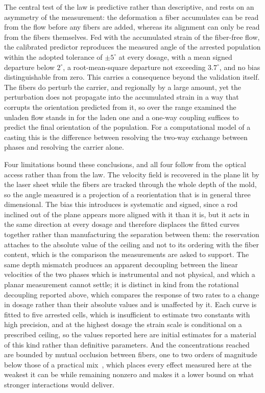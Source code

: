 \documentclass[%
  aip,
  pof,          %
  reprint,      %
  floatfix
]{revtex4-2}
\begin{document}
The central test of the law is predictive rather than descriptive, and rests on an asymmetry of the measurement: the deformation a fiber accumulates can be read from the flow before any fibers are added, whereas its alignment can only be read from the fibers themselves. Fed with the accumulated strain of the fiber-free flow, the calibrated predictor reproduces the measured angle of the arrested population within the adopted tolerance of $\pm 5^\circ$ at every dosage, with a mean signed departure below $2^\circ$, a root-mean-square departure not exceeding $3.7^\circ$, and no bias distinguishable from zero. This carries a consequence beyond the validation itself. The fibers do perturb the carrier, and regionally by a large amount, yet the perturbation does not propagate into the accumulated strain in a way that corrupts the orientation predicted from it, so over the range examined the unladen flow stands in for the laden one and a one-way coupling suffices to predict the final orientation of the population. For a computational model of a casting this is the difference between resolving the two-way exchange between phases and resolving the carrier alone.

Four limitations bound these conclusions, and all four follow from the optical access rather than from the law. The velocity field is recovered in the plane lit by the laser sheet while the fibers are tracked through the whole depth of the mold, so the angle measured is a projection of a reorientation that is in general three dimensional. The bias this introduces is systematic and signed, since a rod inclined out of the plane appears more aligned with it than it is, but it acts in the same direction at every dosage and therefore displaces the fitted curves together rather than manufacturing the separation between them: the reservation attaches to the absolute value of the ceiling and not to its ordering with the fiber content, which is the comparison the measurements are asked to support. The same depth mismatch produces an apparent decoupling between the linear velocities of the two phases which is instrumental and not physical, and which a planar measurement cannot settle; it is distinct in kind from the rotational decoupling reported above, which compares the response of two rates to a change in dosage rather than their absolute values and is unaffected by it. Each curve is fitted to five arrested cells, which is insufficient to estimate two constants with high precision, and at the highest dosage the strain scale is conditional on a prescribed ceiling, so the values reported here are initial estimates for a material of this kind rather than definitive parameters. And the concentrations reached are bounded by mutual occlusion between fibers, one to two orders of magnitude below those of a practical mix~\cite{luo2023fiber}, which places every effect measured here at the weakest it can be while remaining nonzero and makes it a lower bound on what stronger interactions would deliver.
\end{document}
